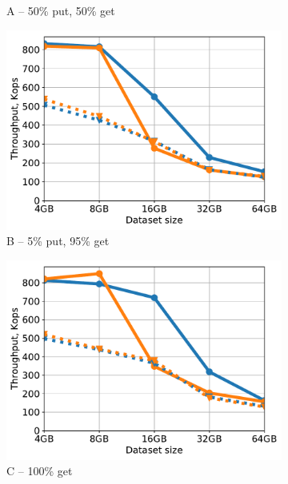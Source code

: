 \begin{figure}[tb]
\begin{subfigure}{0.33\linewidth}
\caption{A -- 50\% put, 50\% get}
\label{fig:throughput:a}
\end{subfigure}
\begin{subfigure}{0.33\linewidth}
\includegraphics[width=\textwidth]{figs/Workload_B_line.pdf}
\caption{B -- 5\% put, 95\% get}
\label{fig:throughput:b}
\end{subfigure}
\hspace{70pt}
\begin{subfigure}{0.33\linewidth}
\includegraphics[width=\textwidth]{figs/Workload_C_line.pdf}
\caption{C -- 100\% get}
\label{fig:throughput:c}
\end{subfigure}
\begin{subfigure}{0.33\linewidth}

\end{subfigure}
\end{figure}

